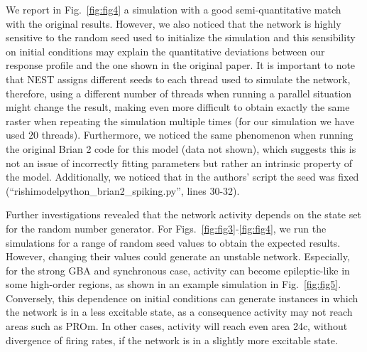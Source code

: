 We report in Fig.~\ref{fig:fig4} a simulation with a good semi-quantitative match with the original results. However, we also noticed that the network is highly sensitive to the random seed used to initialize the simulation and this sensibility on initial conditions may explain the quantitative deviations between our response profile and the one shown in the original paper. It is important to note that NEST assigns different seeds to each thread used to simulate the network, therefore, using a different number of threads when running a parallel situation might change the result, making even more difficult to obtain exactly the same raster when repeating the simulation multiple times (for our simulation we have used $20$ threads). Furthermore, we noticed the same phenomenon  when running the original Brian 2 code for this model (data not shown), which suggests this is not an issue of incorrectly fitting parameters but rather an intrinsic property of the model. Additionally, we noticed that in the authors' script the seed was fixed (``rishimodelpython\_brian2\_spiking.py'', lines 30-32).



Further investigations revealed that the network activity depends on the state set for the random number generator. For Figs.~\ref{fig:fig3}-\ref{fig:fig4}, we run the simulations for a range of random seed values to obtain the expected results. However, changing their values could generate an unstable network. Especially, for the strong GBA and synchronous case, activity can become epileptic-like in some high-order regions, as shown in an example simulation in Fig.~\ref{fig:fig5}. Conversely, this dependence on initial conditions can generate instances in which the network is in a less excitable state, as a consequence activity may not reach areas such as PROm. In other cases, activity will reach even area 24c, without divergence of firing rates, if the network is in a slightly more excitable state.

